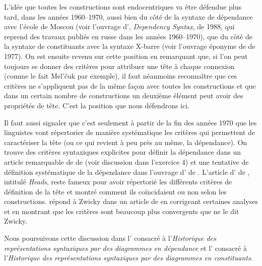{    L’idée que toutes les constructions sont endocentriques va être défendue plus tard, dans les années 1960--1970, aussi bien du côté de la syntaxe de dépendance avec l’école de Moscou (voir l’ouvrage d’, \textit{Dependency Syntax}, de 1988, qui reprend des travaux publiés en russe dans les années 1960--1970), que du côté de la syntaxe de constituants avec la syntaxe X-barre (voir l’ouvrage éponyme de  de 1977). On est ensuite revenu sur cette position en remarquant que, si l’on peut toujours se donner des critères pour attribuer une tête à chaque connexion (comme le fait Mel’čuk par exemple), il faut néanmoins reconnaître que ces critères ne s’appliquent pas de la même façon avec toutes les constructions et que dans un certain nombre de constructions un deuxième élément peut avoir des propriétés de tête. C’est la position que nous défendrons ici.

    Il faut aussi signaler que c’est seulement à partir de la fin des années 1970 que les linguistes vont répertorier de manière systématique les critères qui permettent de caractériser la tête (ou ce qui revient à peu près au même, la dépendance). On trouve des critères syntaxiques explicites pour définir la dépendance dans un article remarquable de  de \citeyear{garde1977ordre} (voir discussion dans l’exercice 4) et une tentative de définition systématique de la dépendance dans l’ouvrage d’ de \citeyear{melcuk1988dependency}. L’article d’ de \citeyear{zwicky1985heads}, intitulé \textit{Heads}, reste fameux pour avoir répertorié les différents critères de définition de la tête et montré comment ils coïncidaient ou non selon les constructions.  répond à Zwicky dans un article de \citeyear{hudson1987zwicky} en corrigeant certaines analyses et en montrant que les critères sont beaucoup plus convergents que ne le dit Zwicky.

    Nous poursuivons cette discussion dans l’ consacré à l’\textit{Historique des représentations syntaxiques par des diagrammes en dépendance} et l’ consacré à l’\textit{Historique des représentations syntaxiques par des diagrammes en constituants}.
}

